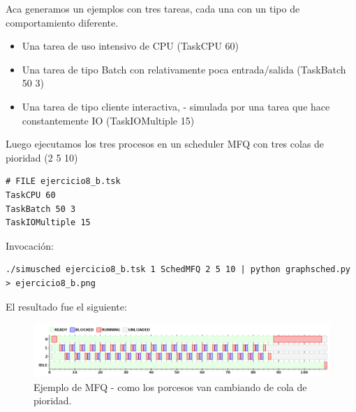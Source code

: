 Aca generamos un ejemplos con tres tareas, cada una con un tipo de comportamiento diferente.

\begin{itemize}
 \item Una tarea de uso intensivo de CPU (TaskCPU 60)
 \item Una tarea de tipo Batch con relativamente poca entrada/salida (TaskBatch 50 3)
 \item Una tarea de tipo cliente interactiva, - simulada por una tarea que hace constantemente IO (TaskIOMultiple 15)
\end{itemize}

Luego ejecutamos los tres procesos en un scheduler MFQ con tres colas de pioridad (2 5 10)

\begin{framed}
\begin{verbatim}
# FILE ejercicio8_b.tsk
TaskCPU 60
TaskBatch 50 3
TaskIOMultiple 15
\end{verbatim}
\end{framed}

Invocaci\'on:

\begin{framed}
\begin{verbatim}
./simusched ejercicio8_b.tsk 1 SchedMFQ 2 5 10 | python graphsched.py > ejercicio8_b.png
\end{verbatim}
\end{framed}

El resultado fue el siguiente:

\begin{figure}[h!]
  \caption{Ejemplo de MFQ - como los porcesos van cambiando de cola de pioridad.}
  \centering
    \includegraphics[width=1\textwidth]{img/ejercicio8_a.png}
\end{figure}

